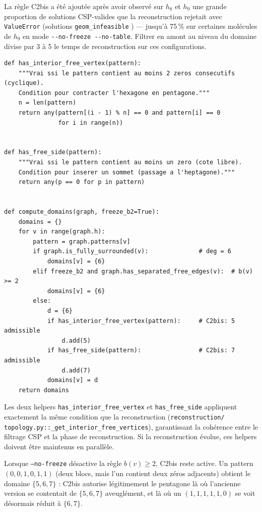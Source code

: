 La règle C2bis a été ajoutée après avoir observé sur $h_8$ et $h_9$ une grande proportion
de solutions CSP-valides que la reconstruction rejetait avec \texttt{ValueError}
(\og solutions \texttt{geom\_infeasible} \fg{}) --- jusqu'à 75\,\% sur certaines molécules
de $h_9$ en mode \texttt{-{}-no-freeze -{}-no-table}. Filtrer en amont au niveau du domaine
divise par 3 à 5 le temps de reconstruction sur ces configurations.

\begin{lstlisting}
def has_interior_free_vertex(pattern):
    """Vrai ssi le pattern contient au moins 2 zeros consecutifs (cyclique).
    Condition pour contracter l'hexagone en pentagone."""
    n = len(pattern)
    return any(pattern[(i - 1) % n] == 0 and pattern[i] == 0
               for i in range(n))


def has_free_side(pattern):
    """Vrai ssi le pattern contient au moins un zero (cote libre).
    Condition pour inserer un sommet (passage a l'heptagone)."""
    return any(p == 0 for p in pattern)


def compute_domains(graph, freeze_b2=True):
    domains = {}
    for v in range(graph.h):
        pattern = graph.patterns[v]
        if graph.is_fully_surrounded(v):              # deg = 6
            domains[v] = {6}
        elif freeze_b2 and graph.has_separated_free_edges(v):  # b(v) >= 2
            domains[v] = {6}
        else:
            d = {6}
            if has_interior_free_vertex(pattern):     # C2bis: 5 admissible
                d.add(5)
            if has_free_side(pattern):                # C2bis: 7 admissible
                d.add(7)
            domains[v] = d
    return domains
\end{lstlisting}

\begin{remarque}
  Les deux helpers \texttt{has\_interior\_free\_vertex} et \texttt{has\_free\_side}
  appliquent exactement la même condition que la reconstruction (\texttt{reconstruction/
  topology.py::\_get\_interior\_free\_vertices}), garantissant la cohérence entre le
  filtrage CSP et la phase de reconstruction. Si la reconstruction évolue, ces helpers
  doivent être maintenus en parallèle.
\end{remarque}

\begin{remarque}
  Lorsque \texttt{--no-freeze} désactive la règle $b(v) \geq 2$, C2bis reste active.
  Un pattern $(0,0,1,0,1,1)$ (deux blocs, mais l'un contient deux zéros adjacents)
  obtient le domaine $\{5, 6, 7\}$ : C2bis autorise légitimement le pentagone là où
  l'ancienne version se contentait de $\{5, 6, 7\}$ aveuglément, et là où un
  $(1,1,1,1,1,0)$ se voit désormais réduit à $\{6, 7\}$.
\end{remarque}

